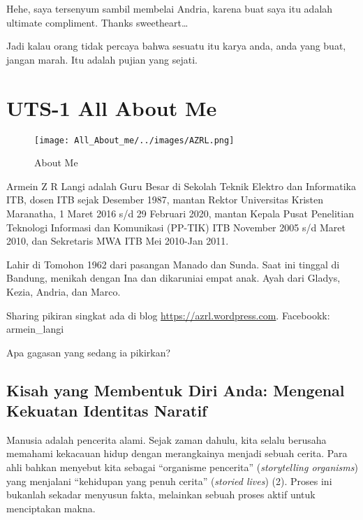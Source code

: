 \documentclass[
  letterpaper,
  DIV=11,
  numbers=noendperiod]{scrreprt}
\begin{document}
Hehe, saya tersenyum sambil membelai Andria, karena buat saya itu adalah
ultimate compliment. Thanks sweetheart\ldots{}

Jadi kalau orang tidak percaya bahwa sesuatu itu karya anda, anda yang
buat, jangan marah. Itu adalah pujian yang sejati.


\chapter{UTS-1 All About Me}\label{uts-1-all-about-me}

\begin{figure}[H]

{\centering \texttt{[image: All\_About\_me/../images/AZRL.png]}

}

\caption{About Me}

\end{figure}%

Armein Z R Langi adalah Guru Besar di Sekolah Teknik Elektro dan
Informatika ITB, dosen ITB sejak Desember 1987, mantan Rektor
Universitas Kristen Maranatha, 1 Maret 2016 s/d 29 Februari 2020, mantan
Kepala Pusat Penelitian Teknologi Informasi dan Komunikasi (PP-TIK) ITB
November 2005 s/d Maret 2010, dan Sekretaris MWA ITB Mei 2010-Jan 2011.

Lahir di Tomohon 1962 dari pasangan Manado dan Sunda. Saat ini tinggal
di Bandung, menikah dengan Ina dan dikaruniai empat anak. Ayah dari
Gladys, Kezia, Andria, dan Marco.

Sharing pikiran singkat ada di blog \url{https://azrl.wordpress.com}.
Facebookk: armein\_langi

Apa gagasan yang sedang ia pikirkan?

\section{\texorpdfstring{\textbf{Kisah yang Membentuk Diri Anda:
Mengenal Kekuatan Identitas
Naratif}}{Kisah yang Membentuk Diri Anda: Mengenal Kekuatan Identitas Naratif}}\label{kisah-yang-membentuk-diri-anda-mengenal-kekuatan-identitas-naratif}

Manusia adalah pencerita alami. Sejak zaman dahulu, kita selalu berusaha
memahami kekacauan hidup dengan merangkainya menjadi sebuah cerita. Para
ahli bahkan menyebut kita sebagai ``organisme pencerita''
(\emph{storytelling organisms}) yang menjalani ``kehidupan yang penuh
cerita'' (\emph{storied lives}) (2). Proses ini bukanlah sekadar
menyusun fakta, melainkan sebuah proses aktif untuk menciptakan makna.
\end{document}
